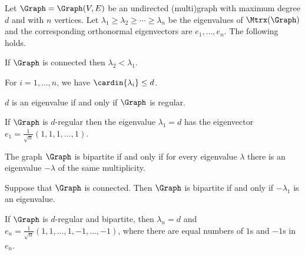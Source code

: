 \begin{theorem}
    Let $\Graph= \Graph(V,E)$ be an undirected (multi)graph with
    maximum degree $d$ and with $n$ vertices.  Let
    $\lambda_1\geq\lambda_2\geq \cdots \geq \lambda_n$ be the
    eigenvalues of $\Mtrx(\Graph)$ and the corresponding orthonormal
    eigenvectors are $e_1,\ldots, e_n$. The following holds.
    \begin{compactenumi}
        \item If $\Graph$ is connected then $\lambda_2 < \lambda_1$.

        \item For $i=1,\ldots, n$, we have
        $\cardin{\lambda_i} \leq d$.

        \item $d$ is an eigenvalue if and only if $\Graph$ is regular.

        \item If $\Graph$ is $d$-regular then the eigenvalue
        $\lambda_1=d$ has the eigenvector $e_1 = \frac{1}{\sqrt{n}}
        (1,1,1, \ldots, 1)$.

        \item The graph $\Graph$ is bipartite if and only if for every
        eigenvalue $\lambda$ there is an eigenvalue $-\lambda$ of the
        same multiplicity.

        \item Suppose that $\Graph$ is connected. Then $\Graph$ is bipartite if
        and only if $-\lambda_1$ is an eigenvalue.

        \item If $\Graph$ is $d$-regular and bipartite, then $\lambda_n =
        d$ and $e_n=\frac{1}{\sqrt{n}} ( 1,1, \ldots, 1, -1, \ldots,
        -1)$, where there are equal numbers of $1$s and $-1$s in
        $e_n$.
    \end{compactenumi}
\end{theorem}
